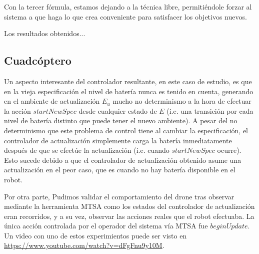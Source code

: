 Con la tercer fórmula, estamos dejando a la técnica libre, permitiéndole forzar al sistema a que haga lo que crea
conveniente para satisfacer los objetivos nuevos.

Los resultados obtenidos...

\subsection{Cuadcóptero}

Un aspecto interesante del controlador resultante, en este caso de estudio, es que en la vieja especificación el nivel
de batería nunca es tenido en cuenta, generando en el ambiente de actualización $E_u$ mucho no determinismo a la hora de
efectuar la acción $startNewSpec$ desde cualquier estado de $E$ (i.e. una transición por cada nivel de batería distinto que
puede tener el nuevo ambiente). A pesar del no determinismo que este problema de control tiene al cambiar la
especificación, el controlador de actualización simplemente carga la batería inmediatamente después de que se efectúe la
actualización (i.e. cuando $startNewSpec$ ocurre). Esto sucede debido a que el controlador de actualización obtenido
asume una actualización en el peor caso, que es cuando no hay batería disponible en el robot.

Por otra parte, Pudimos validar el comportamiento del drone tras observar mediante la herramienta MTSA como los estados
del controlador de actualización eran recorridos, y a su vez, observar las acciones reales que el robot efectuaba. La
única acción controlada por el operador del sistema vía MTSA fue $beginUpdate$. Un video con uno de estos experimientos
puede ser visto en \url{https://www.youtube.com/watch?v=dFgFnu9y10M}.


